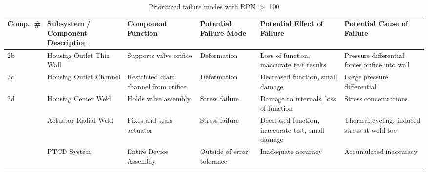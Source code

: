 \documentclass[12pt, letterpaper]{report}%
\begin{document}
		\begin{table}[h]
			\centering
			\caption{Prioritized failure modes with RPN $>$ 100}
			\label{tab:RPN_priority}
			\footnotesize
			\renewcommand{\arraystretch}{1.3}
			\begin{tabularx}{\textwidth}{
				>{\centering\arraybackslash}p{1.0cm}
				>{\raggedright\arraybackslash}p{2.4cm}
				>{\raggedright\arraybackslash}p{2.2cm}
				>{\raggedright\arraybackslash}p{2.0cm}
				>{\raggedright\arraybackslash}p{3.5cm}
				>{\raggedright\arraybackslash}X}
				\toprule
				\textbf{Comp.\ \#} & \textbf{Subsystem / Component Description} & \textbf{Component Function} & \textbf{Potential Failure Mode} & \textbf{Potential Effect of Failure} & \textbf{Potential Cause of Failure} \\
				\midrule
				2b & Housing Outlet Thin Wall & Supports valve orifice & Deformation & Loss of function, inaccurate test results & Pressure differential forces orifice into wall \\[4pt]
				2c & Housing Outlet Channel & Restricted diam channel from orifice & Deformation & Decreased function, small damage & Large pressure differential \\[4pt]
				2d & Housing Center Weld & Holds valve assembly & Stress failure & Damage to internals, loss of function & Stress concentrations \\[4pt]
				4  & Actuator Radial Weld & Fixes and seals actuator & Stress failure & Decreased function, inaccurate test, small damage & Thermal cycling, induced stress at weld toe \\[4pt]
				10 & PTCD System & Entire Device Assembly & Outside of error tolerance & Inadequate accuracy & Accumulated inaccuracy \\
				\bottomrule
			\end{tabularx}
		\end{table}
\end{document}
